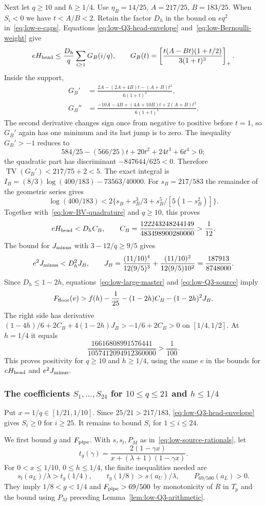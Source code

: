 Next let $q\ge10$ and $h\ge1/4$.  Use $\eta_B=14/25$,
$A=217/25$, $B=183/25$. When $S_i<0$ we have $t<A/B<2$.
Retain the factor $D_h$ in the bound on $eq^2$ in~\eqref{eq:low-e-caps}. Equations
\eqref{eq:low-Q3-head-envelope} and~\eqref{eq:low-Bernoulli-weight} give
\[
 eH_{\rm head}\le\frac{D_h}{q}\sum_{i\ge1}G_B(i/q),\qquad
 G_B(t)=\left[\frac{t(A-Bt)(1+t/2)}{3(1+t)^3}\right]_+.
\]
Inside the support,
\[\begin{aligned}
 G_B'&=\frac{2A-(2A+4B)t-(A+B)t^2}{6(1+t)^4},\\
 G_B''&=\frac{-10A-4B+(4A+10B)t+2(A+B)t^2}{6(1+t)^5}.
\end{aligned}\]
The second derivative changes sign once from negative to positive
before $t=1$, so $G_B'$ again has one minimum and its last jump is
to zero.  The inequality $G_B'>-1$ reduces to
\[
 584/25-(566/25)t+20t^2+24t^3+6t^4>0;
\]
the quadratic part has discriminant $-847644/625<0$.
Therefore $\operatorname{TV}(G_B')<217/75+2<5$.
The exact integral is $I_B=(8/3)\log(400/183)-73563/40000$.
For $s_B=217/583$ the remainder of the geometric series gives
\[
 \log(400/183)<2\{s_B+s_B^3/3+s_B^5/[5(1-s_B^2)]\}.
\]
Together with~\eqref{eq:low-BV-quadrature} and $q\ge10$, this proves
\[
 eH_{\rm head}<D_h C_B,\qquad
 C_B=\frac{122243248244149}{483498900280000}>\frac1{12}.
\]
The bound for $J_{\rm minus}$ with $3-12/q\ge9/5$ gives
\[
 e^2J_{\rm minus}<D_h^2J_B,\qquad
 J_B=\frac{(11/10)^4}{12(9/5)^3}
       +\frac{(11/10)^2}{12(9/5)10^2}
       =\frac{187913}{8748000}.
\]
Since $D_h\le1-2h$, equations~\eqref{eq:low-large-master} and
\eqref{eq:low-Q3-source} imply
\[
 F_{\rm floor}(v)>f(h)-\frac1{25}-(1-2h)C_B-(1-2h)^2J_B.
\]
The right side has derivative
$(1-4h)/6+2C_B+4(1-2h)J_B>-1/6+2C_B>0$ on $[1/4,1/2]$.
At $h=1/4$ it equals
\[
 \frac{16616808991576441}{1057412094912360000}>\frac1{100}.
\]
This proves positivity for $q\ge10$ and $h\ge1/4$, using the same
$e$ in the bounds for $eH_{\rm head}$ and $e^2J_{\rm minus}$.

\subsubsection{\texorpdfstring{The coefficients $S_1,\ldots,S_{24}$ for $10\le q\le21$ and $h\le1/4$}{The first 24 coefficients S(i) for 10 <= q <= 21 and h <= 1/4}}
Put $x=1/q\in[1/21,1/10]$. Since $25/21>217/183$,
\eqref{eq:low-Q3-head-envelope} gives $S_i\ge0$ for $i\ge25$.
It remains to bound $S_i$ for $1\le i\le24$.

We first bound $g$ and $F_{\rm pipe}$. With
$s,s_l,P_M$ as in~\eqref{eq:low-source-rationals}, let
\[
 t_g(\gamma)=\frac{2(1-\gamma x)}{x+(\lambda+1)(1-\gamma x)}.
\]
For $0<x\le1/10$, $0\le h\le1/4$, the finite inequalities
needed are
\begin{equation}\label{eq:low-Q3c-source-checks}
 s_l(a_L)/\lambda>t_g(1/4),\qquad
 t_g(1/8)>s(a_U)/\lambda,\qquad P_{69/500}(a_L)>0.
\end{equation}
They imply $1/8<g<1/4$ and $F_{\rm pipe}>69/500$ by monotonicity
of $R$ in $T_p$ and the bound using $P_M$ preceding
Lemma~\ref{lem:low-Q3-arithmetic}.

